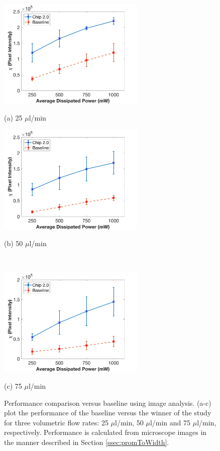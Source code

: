 \begin{figure}[H]
  \begin{minipage}[t]{0.49\linewidth}\centering
    \includegraphics[width=7cm]{ErrorBars25ul}
    \medskip
    \centerline{(a) 25 $\mu$l/min}
  \end{minipage}\hfill
  \begin{minipage}[t]{0.49\linewidth}\centering
    \includegraphics[width=7cm]{ErrorBars50ul}
    \medskip
    \centerline{(b) 50 $\mu$l/min}\\
  \end{minipage}
  \begin{minipage}[t]{0.99\linewidth}\centering
    \includegraphics[width=7cm]{ErrorBars75ul}
    \medskip
    \centerline{(c) 75 $\mu$l/min}
  \end{minipage}
  \caption[Performance comparison versus baseline using image analysis]{Performance comparison versus baseline using image analysis. (a-c) plot the performance of the baseline versus the winner of the study for three volumetric flow rates: 25 $\mu$l/min, 50 $\mu$l/min and 75 $\mu$l/min, respectively. Performance is calculated from microscope images in the manner described in Section \ref{ssec:promToWidth}.}
	\label{fig:headToHeadImages}
\end{figure}


